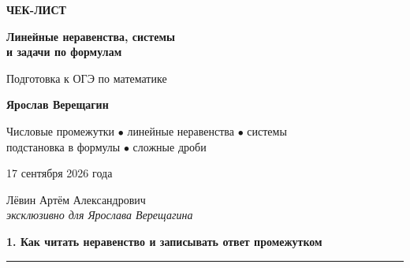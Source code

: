 \documentclass[a4paper,12pt]{article}
\newcommand{\topic}[1]{%
  \Needspace{9\baselineskip}%
  \par\bigskip
  {\Large\bfseries\color{darkaccent}#1}\par
  \vspace{1mm}
  {\color{accent!55}\rule{\linewidth}{0.5pt}}\par
  \medskip
}
\begin{document}
\begin{titlepage}
\thispagestyle{empty}
\begin{center}

\vspace*{2.2cm}

{\color{darkaccent}\Large\bfseries ЧЕК-ЛИСТ}

\vspace{0.7cm}

{\Huge\bfseries
Линейные неравенства, системы\\[2mm]
и задачи по формулам
}

\vspace{0.9cm}

{\large Подготовка к ОГЭ по математике}

\vspace{1.8cm}

{\Large\bfseries Ярослав Верещагин}

\vspace{0.7cm}

{\normalsize
Числовые промежутки \(\bullet\) линейные неравенства \(\bullet\) системы\\
подстановка в формулы \(\bullet\) сложные дроби
}

\vfill

{\large 17 сентября 2026 года}

\vspace{1cm}

{\normalsize
Лёвин Артём Александрович\\[1mm]
\textit{эксклюзивно для Ярослава Верещагина}
}

\vspace{1.6cm}


\end{center}
\end{titlepage}

\topic{1. Как читать неравенство и записывать ответ промежутком}
\end{document}
